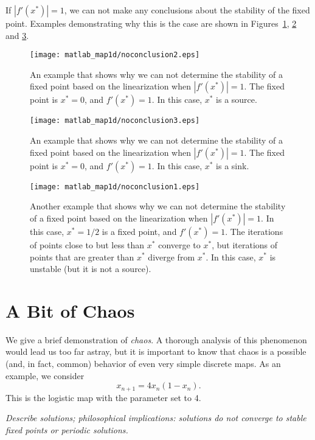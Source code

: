 \bigskip
If $|f'(x^*)|=1$, we can not make any conclusions about the
stability of the fixed point.  Examples demonstrating why this
is the case are shown in Figures~\ref{fig:noconclusion2},
\ref{fig:noconclusion3}
and \ref{fig:noconclusion1}.
%
\begin{figure}
\centerline{%
\texttt{[image: matlab\_map1d/noconclusion2.eps]}%
}
\caption{An example that shows why we can not determine
the stability of a fixed point based on the linearization
when
$|f'(x^*)|=1$.  The fixed point is $x^*=0$, and $f'(x^*)=1$.
In this case, $x^*$ is a source.}
\label{fig:noconclusion2}
\end{figure}
%
\begin{figure}
\centerline{%
\texttt{[image: matlab\_map1d/noconclusion3.eps]}%
}
\caption{An example that shows why we can not determine
the stability of a fixed point based on the linearization
when
$|f'(x^*)|=1$.  The fixed point is $x^*=0$, and $f'(x^*)=1$.
In this case, $x^*$ is a sink.}
\label{fig:noconclusion3}
\end{figure}
%
\begin{figure}
\centerline{%
\texttt{[image: matlab\_map1d/noconclusion1.eps]}%
}
\caption{Another example that shows why we can not determine
the stability of a fixed point based on the linearization
when
$|f'(x^*)|=1$.  In this case, $x^*=1/2$ is a fixed point,
and $f'(x^*)=1$.
The iterations of points close to but less than $x^*$
converge to $x^*$, but iterations of points that are
greater than $x^*$ diverge from $x^*$.
In this case, $x^*$ is unstable (but it is not a source).
}
\label{fig:noconclusion1}
\end{figure}


%
\section{A Bit of Chaos}
We give a brief demonstration of \emph{chaos}.
A thorough analysis of this phenomenon would lead us too far
astray, but it is important to know that chaos is a possible
(and, in fact, common) behavior of even very simple
discrete maps.
As an example, we consider
\begin{equation}
   x_{n+1} = 4x_n(1-x_n).
\end{equation}
This is the logistic map with the parameter set to 4.

\emph{Describe solutions; philosophical implications: solutions
do not converge to stable fixed points or periodic solutions.}
%

